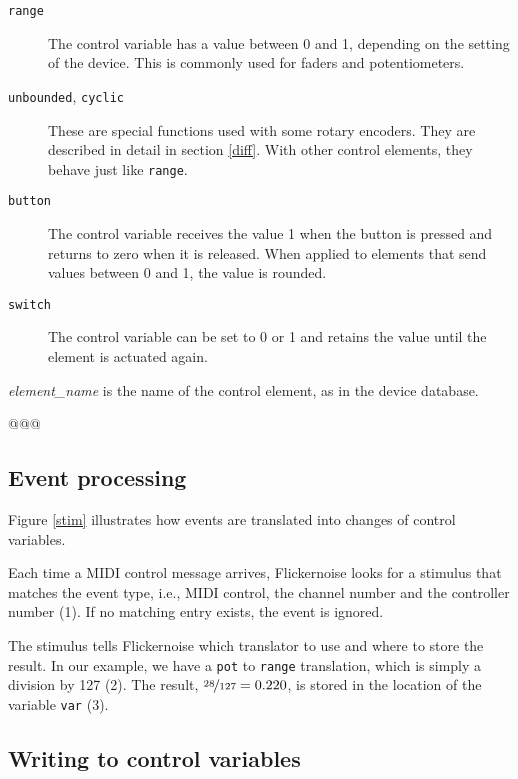 \documentclass[11pt,a4paper]{article}
\begin{document}
\begin{description}
  \item[\tt range]
    The control variable has a value between 0 and 1, depending on the
    setting of the device. This is commonly used for faders and
    potentiometers.
  \item[{\tt unbounded}, {\tt cyclic}]
    These are special functions used with some rotary encoders. They
    are described in detail in section \ref{diff}. With other control
    elements, they behave just like {\tt range}.
  \item[\tt button]
    The control variable receives the value 1 when the button is
    pressed and returns to zero when it is released. When applied to
    elements that send values between 0 and 1, the value is rounded.
  \item[\tt switch]
    The control variable can be set to 0 or 1 and retains the value
    until the element is actuated again.
\end{description}

{\em element\_name} is the name of the control element, as in the
device database.

\figbind

@@@




\figstim

\subsection{Event processing}

Figure \ref{stim} illustrates how events are translated into changes
of control variables.

Each time a MIDI control message arrives, Flickernoise looks for a
stimulus that matches the event type, i.e., MIDI control, the channel
number and the controller number (1). If no matching entry exists,
the event is ignored.

The stimulus tells Flickernoise which translator to use and where
to store the result. In our example, we have a {\tt pot} to {\tt range}
translation, which is simply a division by 127 (2). The result,
$\nicefrac{28}{127}=0.220$, is stored in the location of the variable
{\tt var} (3).




\subsection{Writing to control variables}
\end{document}
